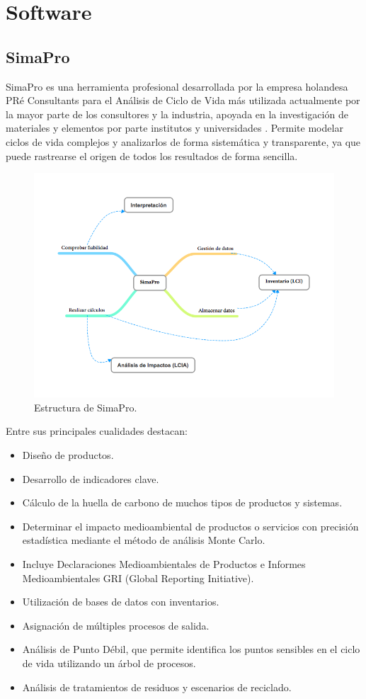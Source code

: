 \section{Software}
\subsection{SimaPro}
SimaPro es una herramienta profesional desarrollada por la empresa holandesa PRé Consultants para el Análisis de Ciclo de Vida más utilizada actualmente por la mayor parte de los consultores y la industria, apoyada en la investigación de materiales y elementos por parte institutos y universidades \cite{mgoedkoop}. Permite modelar ciclos de vida complejos y analizarlos de forma sistemática y transparente, ya que puede rastrearse el origen de todos los resultados de forma sencilla.

\begin{figure}[!htb]
\centering
\includegraphics[width=15cm]{simapro.png}
\caption{Estructura de SimaPro.}
\label{fig:simapro}
\end{figure}

Entre sus principales cualidades destacan:

\begin{itemize}
  \item Diseño de productos.
  \item Desarrollo de indicadores clave.
  \item Cálculo de la huella de carbono de muchos tipos de productos y sistemas.
  \item Determinar el impacto medioambiental de productos o servicios con precisión estadística mediante el método de análisis Monte Carlo.
  \item Incluye Declaraciones Medioambientales de Productos e Informes Medioambientales GRI (Global Reporting Initiative).
  \item Utilización de bases de datos con inventarios.
  \item Asignación de múltiples procesos de salida.
  \item Análisis de Punto Débil, que permite identifica los puntos sensibles en el ciclo de vida utilizando un árbol de procesos.
  \item Análisis de tratamientos de residuos y escenarios de reciclado.
\end{itemize}


